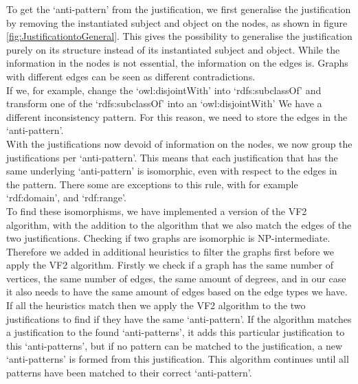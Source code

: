 \documentclass[11pt,letterpaper ,oneside ]{book}
\begin{document}
	
	To get the `anti-pattern' from the justification, we first generalise the justification by removing the instantiated subject and object on the nodes, as shown in figure \ref{fig:JustificationtoGeneral}. This gives the possibility to generalise the justification purely on its structure instead of its instantiated subject and object. While the information in the nodes is not essential, the information on the edges is. Graphs with different edges can be seen as different contradictions. \\
	If we, for example, change the `owl:disjointWith' into `rdfs:subclassOf' and transform one of the `rdfs:subclassOf' into an `owl:disjointWith' We have a different inconsistency pattern. For this reason, we need to store the edges in the `anti-pattern'.\\
	With the justifications now devoid of information on the nodes, we now group the justifications per `anti-pattern'. This means that each justification that has the same underlying `anti-pattern' is isomorphic, even with respect to the edges in the pattern. There some are exceptions to this rule, with for example `rdf:domain', and `rdf:range'.\\
	To find these isomorphisms, we have implemented a version of the VF2 algorithm\cite{LCordella:2004}, with the addition to the algorithm that we also match the edges of the two justifications. Checking if two graphs are isomorphic is NP-intermediate. Therefore we added in additional heuristics to filter the graphs first before we apply the VF2 algorithm. Firstly we check if a graph has the same number of vertices, the same number of edges, the same amount of degrees, and in our case it also needs to have the same amount of edges based on the edge types we have. If all the heuristics match then we apply the VF2 algorithm to the two justifications to find if they have the same `anti-pattern'. If the algorithm matches a justification to the found `anti-patterns', it adds this particular justification to this `anti-patterns', but if no pattern can be matched to the justification, a new `anti-patterns' is formed from this justification. This algorithm continues until all patterns have been matched to their correct `anti-pattern'.\\
	
\end{document}

